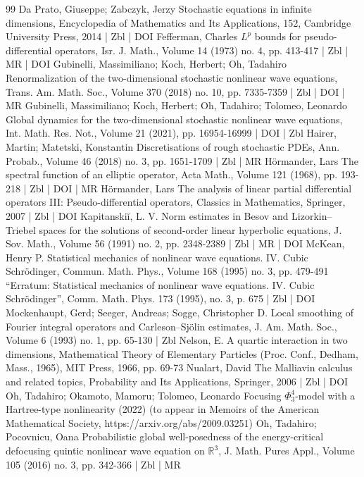 \begin{thebibliography}{99}
 Da Prato, Giuseppe; Zabczyk, Jerzy Stochastic equations in infinite dimensions, Encyclopedia of Mathematics and Its Applications, 152, Cambridge University Press, 2014 | Zbl | DOI
 Fefferman, Charles ${L}^p$ bounds for pseudo-differential operators, Isr. J. Math., Volume 14 (1973) no. 4, pp. 413-417 | Zbl | MR | DOI
 Gubinelli, Massimiliano; Koch, Herbert; Oh, Tadahiro Renormalization of the two-dimensional stochastic nonlinear wave equations, Trans. Am. Math. Soc., Volume 370 (2018) no. 10, pp. 7335-7359 | Zbl | DOI | MR
 Gubinelli, Massimiliano; Koch, Herbert; Oh, Tadahiro; Tolomeo, Leonardo Global dynamics for the two-dimensional stochastic nonlinear wave equations, Int. Math. Res. Not., Volume 21 (2021), pp. 16954-16999 | DOI | Zbl
 Hairer, Martin; Matetski, Konstantin Discretisations of rough stochastic PDEs, Ann. Probab., Volume 46 (2018) no. 3, pp. 1651-1709 | Zbl | MR
 Hörmander, Lars The spectral function of an elliptic operator, Acta Math., Volume 121 (1968), pp. 193-218 | Zbl | DOI | MR
 Hörmander, Lars The analysis of linear partial differential operators III: Pseudo-differential operators, Classics in Mathematics, Springer, 2007 | Zbl | DOI
 Kapitanskiĭ, L. V. Norm estimates in Besov and Lizorkin–Triebel spaces for the solutions of second-order linear hyperbolic equations, J. Sov. Math., Volume 56 (1991) no. 2, pp. 2348-2389 | Zbl | MR | DOI
 McKean, Henry P. Statistical mechanics of nonlinear wave equations. IV. Cubic Schrödinger, Commun. Math. Phys., Volume 168 (1995) no. 3, pp. 479-491 “Erratum: Statistical mechanics of nonlinear wave equations. IV. Cubic Schrödinger”, Comm. Math. Phys. 173 (1995), no. 3, p. 675 | Zbl | DOI
 Mockenhaupt, Gerd; Seeger, Andreas; Sogge, Christopher D. Local smoothing of Fourier integral operators and Carleson–Sjölin estimates, J. Am. Math. Soc., Volume 6 (1993) no. 1, pp. 65-130 | Zbl
 Nelson, E. A quartic interaction in two dimensions, Mathematical Theory of Elementary Particles (Proc. Conf., Dedham, Mass., 1965), MIT Press, 1966, pp. 69-73
 Nualart, David The Malliavin calculus and related topics, Probability and Its Applications, Springer, 2006 | Zbl | DOI
 Oh, Tadahiro; Okamoto, Mamoru; Tolomeo, Leonardo Focusing $\Phi ^{4}_{3}$-model with a Hartree-type nonlinearity (2022) (to appear in Memoirs of the American Mathematical Society, https://arxiv.org/abs/2009.03251)
 Oh, Tadahiro; Pocovnicu, Oana Probabilistic global well-posedness of the energy-critical defocusing quintic nonlinear wave equation on $\mathbb{R}^3$, J. Math. Pures Appl., Volume 105 (2016) no. 3, pp. 342-366 | Zbl | MR

\end{thebibliography}

